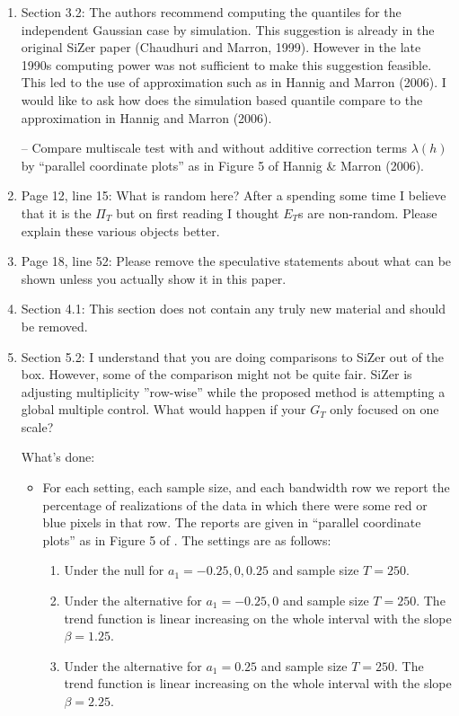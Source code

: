 \documentclass[a4paper,12pt]{article}
\begin{document}
\newpage
{} 
\vspace{0.25cm}

\begin{enumerate}
\item Section 3.2: The authors recommend computing the quantiles for the independent Gaussian case by simulation. This suggestion is already in the original SiZer paper (Chaudhuri and Marron, 1999). However in the late 1990s computing power was not sufficient to make this suggestion feasible. This led to the use of approximation such as in Hannig and Marron (2006). I would like to ask how does the simulation based quantile compare to the approximation in Hannig and Marron (2006). 

-- Compare multiscale test with and without additive correction terms $\lambda(h)$ by ``parallel coordinate plots'' as in Figure 5 of Hannig \& Marron (2006). 

\item Page 12, line 15: What is random here? After a spending some time I believe that it is the $\Pi_T$ but on first reading I thought $E_T$s are non-random. Please explain these various objects better.
\item Page 18, line 52: Please remove the speculative statements about what can be shown unless you actually show it in this paper.

\item Section 4.1: This section does not contain any truly new material and should be removed.

\item Section 5.2: I understand that you are doing comparisons to SiZer out of the box. However, some of the comparison might not be quite fair. SiZer is adjusting multiplicity ”row-wise” while the proposed method is attempting a global multiple control. What would happen if your $G_T$ only focused on one scale?

What's done:
\begin{itemize}
\item For each setting, each sample size, and each bandwidth row we report the percentage of realizations of the data in which there were some red or blue pixels in that row. The reports are given in ``parallel coordinate plots'' as in Figure 5 of \cite*{HannigMarron2006}. The settings are as follows:
\begin{enumerate}
\item Under the null for $a_1 = -0.25, 0, 0.25$ and sample size $T = 250$.
\item Under the alternative for $a_1 = -0.25, 0$ and sample size $T = 250$. The trend function is linear increasing on the whole interval with the slope $\beta = 1.25$. 
\item Under the alternative for $a_1 = 0.25$ and sample size $T = 250$. The trend function is linear increasing on the whole interval with the slope $\beta = 2.25$. 
\end{enumerate}
\end{itemize}


\end{enumerate}
\end{document}
